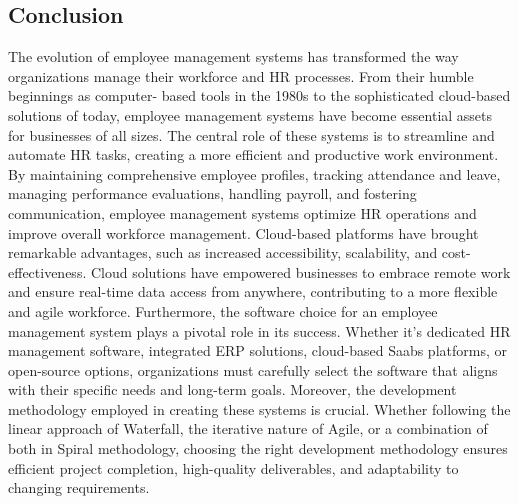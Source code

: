 \subsection{Conclusion}
The evolution of employee management systems has transformed the way organizations
manage their workforce and HR processes. From their humble beginnings as computer-
based tools in the 1980s to the sophisticated cloud-based solutions of today, employee
management systems have become essential assets for businesses of all sizes. The central
role of these systems is to streamline and automate HR tasks, creating a more efficient and
productive work environment. By maintaining comprehensive employee profiles, tracking
attendance and leave, managing performance evaluations, handling payroll, and fostering
communication, employee management systems optimize HR operations and improve
overall workforce management. Cloud-based platforms have brought remarkable
advantages, such as increased accessibility, scalability, and cost-effectiveness. Cloud
solutions have empowered businesses to embrace remote work and ensure real-time data
access from anywhere, contributing to a more flexible and agile workforce. Furthermore, the
software choice for an employee management system plays a pivotal role in its success.
Whether it's dedicated HR management software, integrated ERP solutions, cloud-based
Saabs platforms, or open-source options, organizations must carefully select the software
that aligns with their specific needs and long-term goals. Moreover, the development
methodology employed in creating these systems is crucial. Whether following the linear
approach of Waterfall, the iterative nature of Agile, or a combination of both in Spiral
methodology, choosing the right development methodology ensures efficient project
completion, high-quality deliverables, and adaptability to changing requirements.